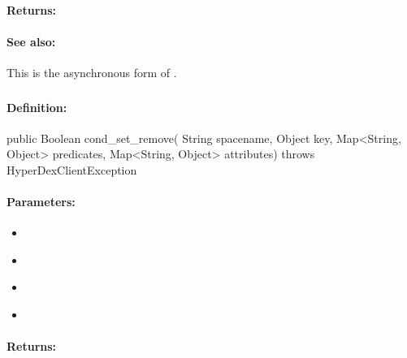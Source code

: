 \paragraph{Returns:}


\paragraph{See also:}  This is the asynchronous form of .

\pagebreak
\subsubsection{}
\label{api:java:cond_set_remove}


\paragraph{Definition:}
\begin{javacode}
public Boolean cond_set_remove(
        String spacename,
        Object key,
        Map<String, Object> predicates,
        Map<String, Object> attributes) throws HyperDexClientException
\end{javacode}

\paragraph{Parameters:}
\begin{itemize}[noitemsep]
\item {}\\

\item {}\\

\item {}\\

\item {}\\

\end{itemize}

\paragraph{Returns:}


